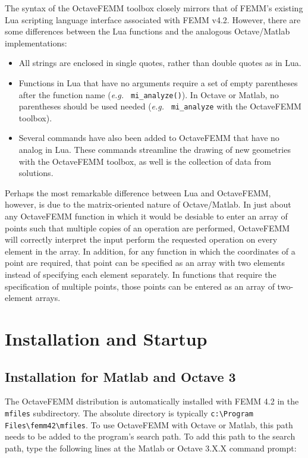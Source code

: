 \documentclass[12pt]{article}
\begin{document}
The syntax of the OctaveFEMM toolbox closely mirrors that of FEMM's existing
Lua scripting language interface associated with FEMM v4.2.  However, there
are some differences between the Lua functions and the analogous Octave/Matlab
implementations:
\begin{itemize}
\item All strings are enclosed in single quotes, rather than
double quotes as in Lua.
\item Functions in Lua that have no arguments require a set of
empty parentheses after the function name ({\em e.g.} {\tt
mi\_analyze()}).  In Octave or Matlab, no parentheses should be used needed ({\em e.g.} {\tt
mi\_analyze} with the OctaveFEMM toolbox).
\item Several commands have also been added to OctaveFEMM that have no
analog in Lua.  These commands streamline the drawing of new
geometries with the OctaveFEMM toolbox, as well is the collection
of data from solutions.
\end{itemize}

Perhaps the most remarkable difference between Lua and OctaveFEMM,
however, is due to the matrix-oriented nature of Octave/Matlab.  In just about any
OctaveFEMM function in which it would be desiable to enter an array
of points such that multiple copies of an operation are performed, OctaveFEMM
will correctly interpret the input perform the requested operation
on every element in the array.  In addition, for any function in which
the coordinates of a point are required, that point can be
specified as an array with two elements instead of specifying each
element separately.  In functions that require the specification
of multiple points, those points can be entered as an array of
two-element arrays.

\section{Installation and Startup}

\subsection{Installation for Matlab and Octave 3}
The OctaveFEMM distribution is automatically installed with FEMM 4.2 in the
\verb+mfiles+ subdirectory.  The absolute directory is typically
\verb+c:\Program Files\femm42\mfiles+.  To use OctaveFEMM with Octave or
Matlab, this path needs to be added to the program's search path. To add
this path to the search path, type the following lines at the Matlab or
Octave 3.X.X command prompt:
\end{document}
